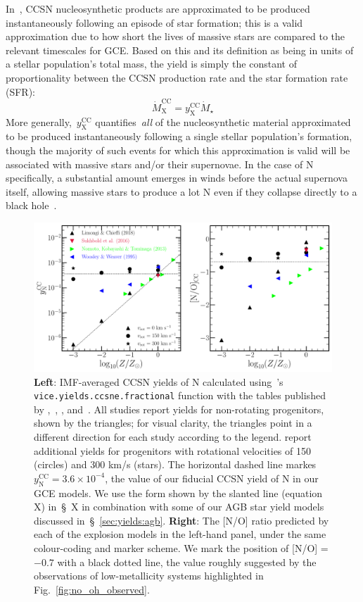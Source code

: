 \documentclass[ms.tex]{subfiles}
\begin{document}
In~\vice, CCSN nucleosynthetic products are approximated to be produced
instantaneously following an episode of star formation; this is a valid
approximation due to how short the lives of massive stars are compared to the
relevant timescales for GCE.
Based on this and its definition as being in units of a stellar population's
total mass, the yield is simply the constant of proportionality between the
CCSN production rate and the star formation rate (SFR):
\begin{equation}
\dot{M}_\text{X}^\text{CC} = y_\text{X}^\text{CC}\dot{M}_\star
\end{equation}
More generally,~$y_\text{X}^\text{CC}$ quantifies~\textit{all} of the
nucleosynthetic material approximated to be produced instantaneously following
a single stellar population's formation, though the majority of such events
for which this approximation is valid will be associated with massive stars
and/or their supernovae.
In the case of N specifically, a substantial amount emerges in winds before the
actual supernova itself, allowing massive stars to produce a lot N even if they
collapse directly to a black hole~\citep{Griffith2021}.

\begin{figure}
\centering
\includegraphics[scale = 0.45]{n_cc_yields.pdf}
\caption{
\textbf{Left}: IMF-averaged CCSN yields of N calculated using~\vice's
\texttt{vice.yields.ccsne.fractional} function with the tables published by
\citet[][blue]{Woosley1995},~\citet[][green]{Nomoto2013},
\citet[][red]{Sukhbold2016}, and~\citet[][black]{Limongi2018}.
All studies report yields for non-rotating progenitors, shown by the triangles;
for visual clarity, the triangles point in a different direction for each study
according to the legend.
\citet{Limongi2018} report additional yields for progenitors with rotational
velocities of 150 (circles) and 300 km/s (stars).
The horizontal dashed line markes~$y_\text{N}^\text{CC} = 3.6\times10^{-4}$,
the value of our fiducial CCSN yield of N in our GCE models.
We use the form shown by the slanted line (equation X) in~\S~X in combination
with some of our AGB star yield models discussed in~\S~\ref{sec:yields:agb}.
\textbf{Right}: The [N/O] ratio predicted by each of the explosion models in
the left-hand panel, under the same colour-coding and marker scheme.
We mark the position of [N/O] = $-0.7$ with a black dotted line, the value
roughly suggested by the observations of low-metallicity systems highlighted
in Fig.~\ref{fig:no_oh_observed}.
}
\label{fig:n_cc_yields}
\end{figure}
\end{document}
